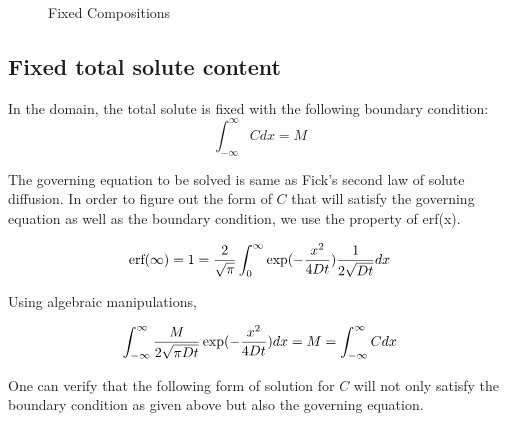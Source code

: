 \begin{figure}[h]
\begin{center}
\end{center}
\caption{Fixed Compositions}
\label{slab}
\end{figure}

\subsection{Fixed total solute content}

In the domain, the total solute is fixed with the following boundary
condition:\\
$$ \int_{-\infty}^{\infty}{C dx} = M$$

The governing equation to be solved is same as Fick's second law of solute
diffusion. In order to figure out the form of $C$ that will satisfy the
governing equation as well as the boundary condition, we use the property of
erf(x).

$$ \text{erf} (\infty) = 1 = {2 \over \sqrt{\pi}} \int_{0}^{\infty}{\exp(-{x^2
\over 4Dt}) {1 \over 2 \sqrt{Dt}} dx}$$

Using algebraic manipulations,

$$ \int_{-\infty}^{\infty}{ {M \over 2 \sqrt{\pi D t}} \exp(-{x^2 \over 4Dt})
dx} = M = \int_{-\infty}^{\infty}{C dx}$$

One can verify that the following form of solution for $C$ will not only satisfy
the boundary condition as given above but also the governing equation.

